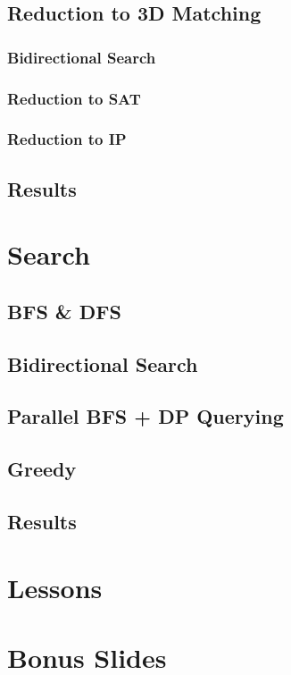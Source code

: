 \documentclass[t,10pt,
mathserif,xcolor=dvipsnames]{beamer}
\begin{document}
\subsection{Reduction to 3D Matching}

\subsubsection{Bidirectional Search}

\subsubsection{Reduction to SAT}

\subsubsection{Reduction to IP}

\subsection{Results}

\section{Search}

\subsection{BFS \& DFS}

\subsection{Bidirectional Search}

\subsection{Parallel BFS + DP Querying}

\subsection{Greedy}

\subsection{Results}

\section{Lessons}



\section{Bonus Slides}
 
\end{document}
